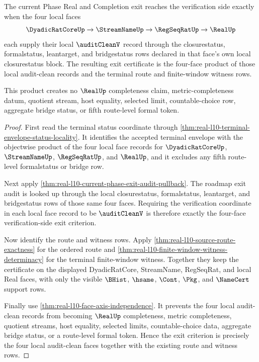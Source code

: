 \begin{theorem}
\label{thm:real-l10-audit-clean-four-face-exit}
The current Phase Real and Completion exit reaches the verification side
exactly when the four local faces
$$
\DyadicRatCoreUp \to \StreamNameUp \to \RegSeqRatUp \to \RealUp
$$
each supply their local $\auditCleanV$ record through the closurestatus,
formalstatus, leantarget, and bridgestatus rows declared in that face's own
local closurestatus block. The resulting exit certificate is the four-face
product of those local audit-clean records and the terminal route and
finite-window witness rows.

This product creates no $\RealUp$ completeness claim, metric-completeness
datum, quotient stream, host equality, selected limit, countable-choice row,
aggregate bridge status, or fifth route-level formal token.
\end{theorem}
\begin{proof}
First read the terminal status coordinate through
\autoref{thm:real-l10-terminal-envelope-status-locality}. It identifies the
accepted terminal envelope with the objectwise product of the four local face
records for $\DyadicRatCoreUp$, $\StreamNameUp$, $\RegSeqRatUp$, and
$\RealUp$, and it excludes any fifth route-level formalstatus or bridge row.

Next apply \autoref{thm:real-l10-current-phase-exit-audit-pullback}. The
roadmap exit audit is looked up through the local closurestatus, formalstatus,
leantarget, and bridgestatus rows of those same four faces. Requiring the
verification coordinate in each local face record to be $\auditCleanV$ is
therefore exactly the four-face verification-side exit criterion.

Now identify the route and witness rows. Apply
\autoref{thm:real-l10-source-route-exactness} for the ordered route and
\autoref{thm:real-l10-finite-window-witness-determinacy} for the terminal
finite-window witness. Together they keep the certificate on the displayed
DyadicRatCore, StreamName, RegSeqRat, and local Real faces, with only the
visible $\BHist$, $\hsame$, $\Cont$, $\Pkg$, and $\NameCert$ support rows.

Finally use \autoref{thm:real-l10-face-axis-independence}. It prevents the
four local audit-clean records from becoming $\RealUp$ completeness,
metric completeness, quotient streams, host equality, selected limits,
countable-choice data, aggregate bridge status, or a route-level formal token.
Hence the exit criterion is precisely the four local audit-clean faces
together with the existing route and witness rows.
\end{proof}

